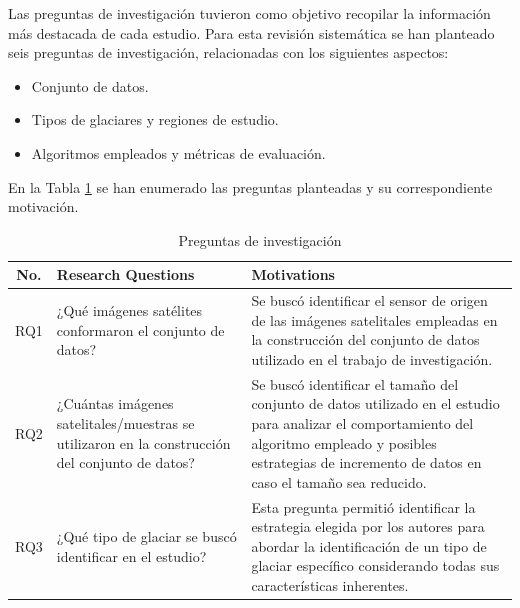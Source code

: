 \documentclass{article}
\begin{document}
Las preguntas de investigación tuvieron como objetivo recopilar la información más destacada de cada estudio. Para esta revisión sistemática se han planteado seis preguntas de investigación, relacionadas con los siguientes aspectos:

\begin{itemize}
    \item Conjunto de datos.
    \item Tipos de glaciares y regiones de estudio.
    \item Algoritmos empleados y métricas de evaluación.
\end{itemize}

En la Tabla \ref{tab:research_questions} se han enumerado las preguntas planteadas y su correspondiente motivación.

\begin{table}[H]
    \centering
    \caption{Preguntas de investigación}
    \hspace{1cm}
    \label{tab:research_questions}
    \begin{tabularx}{\textwidth}{cXX}
        \hline
        \textbf{No.} & \textbf{Research Questions}                                                                    & \textbf{Motivations}                                                                                                                                                                                              \\ \hline
        RQ1          & ¿Qué imágenes satélites conformaron el conjunto de datos?                                      & Se buscó identificar el sensor de origen de las imágenes satelitales empleadas en la construcción del conjunto de datos utilizado en el trabajo de investigación.                                                 \\ \hline
        RQ2          & ¿Cuántas imágenes satelitales/muestras se utilizaron en la construcción del conjunto de datos? & Se buscó identificar el tamaño del conjunto de datos utilizado en el estudio para analizar el comportamiento del algoritmo empleado y posibles estrategias de incremento de datos en caso el tamaño sea reducido. \\ \hline
        RQ3          & ¿Qué tipo de glaciar se buscó identificar en el estudio?                                       & Esta pregunta permitió identificar la estrategia elegida por los autores para abordar la identificación de un tipo de glaciar específico considerando todas sus características inherentes.                       \\ \hline

\end{tabularx}
\end{table}
\end{document}
